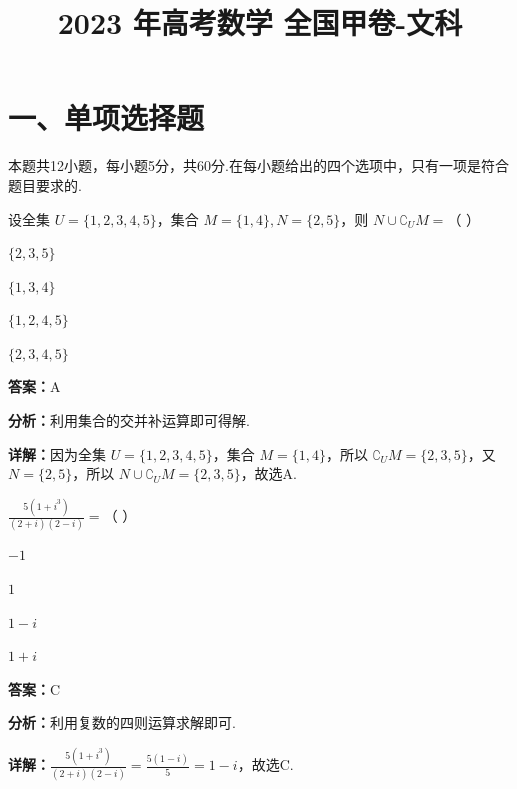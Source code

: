 ﻿\title{2023 年高考数学 全国甲卷-文科}
\date{}
\maketitle

\section*{一、单项选择题}
本题共12小题，每小题5分，共60分.在每小题给出的四个选项中，只有一项是符合题目要求的.

\begin{question}[points=5]
设全集 $U = \{1,2,3,4,5\}$，集合 $M = \{1,4\}, N = \{2,5\}$，则 $N \cup \complement_U M =$（    ）
\begin{choices}
  \item $\{2,3,5\}$
  \item $\{1,3,4\}$
  \item $\{1,2,4,5\}$
  \item $\{2,3,4,5\}$
\end{choices}
\begin{solution}
\textbf{答案：}A

\textbf{分析：}利用集合的交并补运算即可得解.

\textbf{详解：}因为全集 $U = \{1,2,3,4,5\}$，集合 $M = \{1,4\}$，所以 $\complement_U M = \{2,3,5\}$，又 $N = \{2,5\}$，所以 $N \cup \complement_U M = \{2,3,5\}$，故选A.
\end{solution}
\end{question}

\begin{question}[points=5]
$\frac{5(1+i^3)}{(2+i)(2-i)} =$（    ）
\begin{choices}
  \item $-1$
  \item $1$
  \item $1-i$
  \item $1+i$
\end{choices}
\begin{solution}
\textbf{答案：}C

\textbf{分析：}利用复数的四则运算求解即可.

\textbf{详解：}$\frac{5(1+i^3)}{(2+i)(2-i)} = \frac{5(1-i)}{5} = 1-i$，故选C.
\end{solution}
\end{question}

